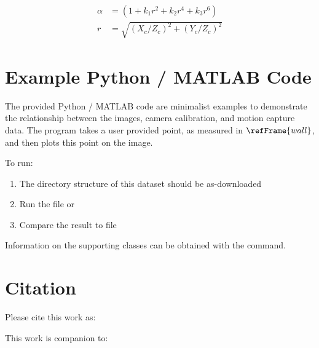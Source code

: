 \begin{align} \label{eq:undistort}
    \alpha& = (1 + k_1r^2 + k_2r^4 + k_3r^6)\\
    r &= \sqrt{(X_c/Z_c)^2 + (Y_c/Z_c)^2}
\end{align}


\section*{Example Python / MATLAB Code}
The provided Python / MATLAB code are minimalist examples to demonstrate the relationship between the images, camera calibration, and motion capture data. The program takes a user provided point, as measured in $\refFrame{wall}$, and then plots this point on the image.

To run:
\begin{enumerate}
    \item The directory structure of this dataset should be as-downloaded
    \item Run the file  or 
    \item Compare the result to file 
\end{enumerate}

Information on the supporting classes can be obtained with the  command.


\section*{Citation}
Please cite this work as:

\begin{adjustwidth}{2em}{2em}
\begin{refsection}
\end{refsection}
\end{adjustwidth}

This work is companion to:

\begin{adjustwidth}{2em}{2em}
\begin{refsection}
\end{refsection}
\end{adjustwidth}

